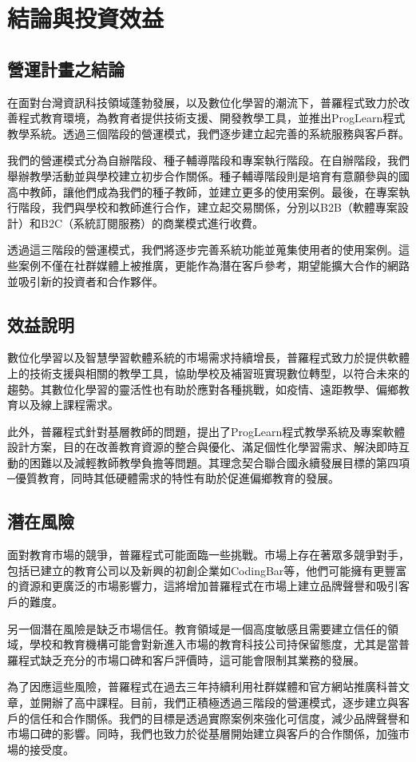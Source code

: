 \section{結論與投資效益}

\subsection{營運計畫之結論}

在面對台灣資訊科技領域蓬勃發展，以及數位化學習的潮流下，普羅程式致力於改善程式教育環境，為教育者提供技術支援、開發教學工具，並推出ProgLearn程式教學系統。透過三個階段的營運模式，我們逐步建立起完善的系統服務與客戶群。

我們的營運模式分為自辦階段、種子輔導階段和專案執行階段。在自辦階段，我們舉辦教學活動並與學校建立初步合作關係。種子輔導階段則是培育有意願參與的國高中教師，讓他們成為我們的種子教師，並建立更多的使用案例。最後，在專案執行階段，我們與學校和教師進行合作，建立起交易關係，分別以B2B（軟體專案設計）和B2C（系統訂閱服務）的商業模式進行收費。

透過這三階段的營運模式，我們將逐步完善系統功能並蒐集使用者的使用案例。這些案例不僅在社群媒體上被推廣，更能作為潛在客戶參考，期望能擴大合作的網路並吸引新的投資者和合作夥伴。

\subsection{效益說明}

數位化學習以及智慧學習軟體系統的市場需求持續增長，普羅程式致力於提供軟體上的技術支援與相關的教學工具，協助學校及補習班實現數位轉型，以符合未來的趨勢。其數位化學習的靈活性也有助於應對各種挑戰，如疫情、遠距教學、偏鄉教育以及線上課程需求。

此外，普羅程式針對基層教師的問題，提出了ProgLearn程式教學系統及專案軟體設計方案，目的在改善教育資源的整合與優化、滿足個性化學習需求、解決即時互動的困難以及減輕教師教學負擔等問題。其理念契合聯合國永續發展目標的第四項─優質教育，同時其低硬體需求的特性有助於促進偏鄉教育的發展。

\subsection{潛在風險}

面對教育市場的競爭，普羅程式可能面臨一些挑戰。市場上存在著眾多競爭對手，包括已建立的教育公司以及新興的初創企業如CodingBar等，他們可能擁有更豐富的資源和更廣泛的市場影響力，這將增加普羅程式在市場上建立品牌聲譽和吸引客戶的難度。

另一個潛在風險是缺乏市場信任。教育領域是一個高度敏感且需要建立信任的領域，學校和教育機構可能會對新進入市場的教育科技公司持保留態度，尤其是當普羅程式缺乏充分的市場口碑和客戶評價時，這可能會限制其業務的發展。

為了因應這些風險，普羅程式在過去三年持續利用社群媒體和官方網站推廣科普文章，並開辦了高中課程。目前，我們正積極透過三階段的營運模式，逐步建立與客戶的信任和合作關係。我們的目標是透過實際案例來強化可信度，減少品牌聲譽和市場口碑的影響。同時，我們也致力於從基層開始建立與客戶的合作關係，加強市場的接受度。